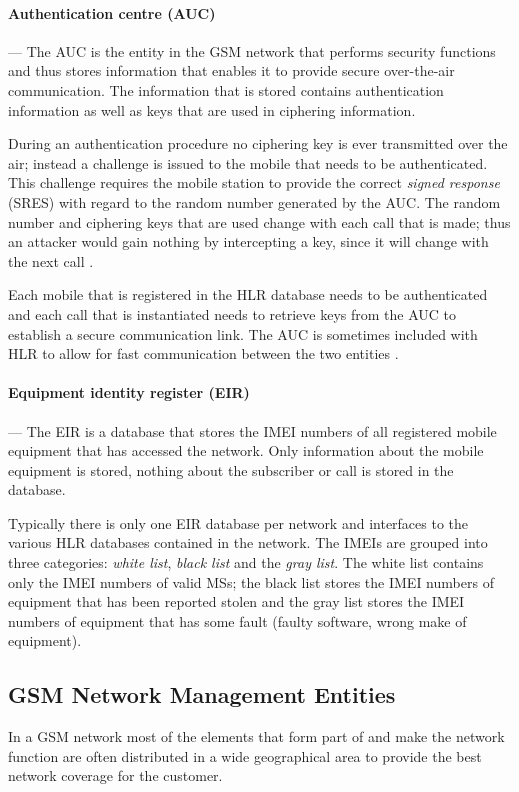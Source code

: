 \paragraph{Authentication centre (AUC)}
--- The AUC is the entity in the GSM network that performs security functions and thus stores information that enables it to provide secure over-the-air communication\cite{GSM92,GSMSysEngin}. The information that is stored contains authentication information as well as keys that are used in ciphering information\cite{GSM92,GSMSysEngin}.

During an authentication procedure no ciphering key is ever transmitted over the air; instead a challenge is issued to the mobile that needs to be authenticated. This challenge requires the mobile station to provide the correct \emph{signed response} (SRES) with regard to the random number generated by the AUC\cite{GSM92,GSMSysEngin}. The random number and ciphering keys that are used change with each call that is made; thus an attacker would gain nothing by intercepting a key, since it will change with the next call \cite{GSMSysEngin}.

Each mobile that is registered in the HLR database needs to be authenticated and each call that is instantiated needs to retrieve keys from the AUC to establish a secure communication link\cite{GSM92,GSMSysEngin}. The AUC is sometimes included with HLR to allow for fast communication between the two entities \cite{GSMSysEngin}.

\paragraph{Equipment identity register (EIR)}
--- The EIR is a database that stores the IMEI numbers of all registered mobile equipment that has accessed the network. Only information about the mobile equipment is stored, nothing about the subscriber or call is stored in the database.

Typically there is only one EIR database per network and interfaces to the various HLR databases contained in the network. The IMEIs are grouped into three categories: \emph{white list}, \emph{black list} and the \emph{gray list}. The white list contains only the IMEI numbers of valid MSs; the black list stores the IMEI numbers of equipment that has been reported stolen and the gray list stores the IMEI numbers of equipment that has some fault (faulty software, wrong make of equipment).

\subsection{GSM Network Management Entities}
In a GSM network most of the elements that form part of and make the network function are often distributed in a wide geographical area to provide the best network coverage for the customer. 

